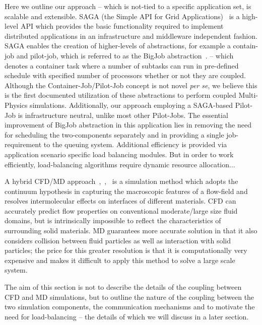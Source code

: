\documentclass[conference,final]{IEEEtran}
\begin{document}
Here we outline our approach -- which is not-tied to a specific application set, is scalable and extensible. SAGA (the Simple API for Grid Applications)~\cite{Jha:2008} is a high-level API which provides the basic functionality required to implement distributed applications in an infrastructure and middleware independent fashion.  SAGA enables the creation of higher-levels of abstractions, for example a contain-job and pilot-job, which is referred to as the BigJob abstraction~\cite{Jha:2009}.  -- which denotes a container task where a number of subtasks can run in pre-defined schedule with specified number of processors whether or not they are coupled.  Although the Container-Job/Pilot-Job concept is not novel {\it per se}, we believe this is the first documented utilization of these abstractions to perform coupled Multi-Physics simulations. Additionally, our approach employing a SAGA-based Pilot-Job is infrastructure neutral, unlike most other Pilot-Jobs.  The essential improvement of BigJob abstraction in this application lies in removing the need for scheduling the two-components separately and in providing a single job-requirement to the queuing system. Additional efficiency is provided via application scenario specific load balancing modules. But in order to work efficiently, load-balancing algorithms require dynamic resource allocation...


A hybrid CFD/MD approach~\cite{Thompson:1995},~\cite{Nie:2004},~\cite{Yen:2007} is a simulation method which adopts the continuum hypothesis in capturing the macroscopic features of a flow-field and resolves intermolecular effects on interfaces of different materials. CFD can accurately predict flow properties on conventional moderate/large size fluid domains, but is intrinsically impossible to reflect the characteristics of surrounding solid materials. MD guarantees more accurate solution in that it also considers collision between fluid particles as well as interaction with solid particles; the price for this greater resolution is that it is computationally very expensive and makes it difficult to apply this method to solve a large scale system.

The aim of this section is not to describe the details of the coupling between CFD and MD simulations, but to outline the nature of the coupling between the two simulation components, the communication 
mechanisms and to motivate the need for load-balancing -- the details of which we will discuss
in a later section. 
\end{document}
